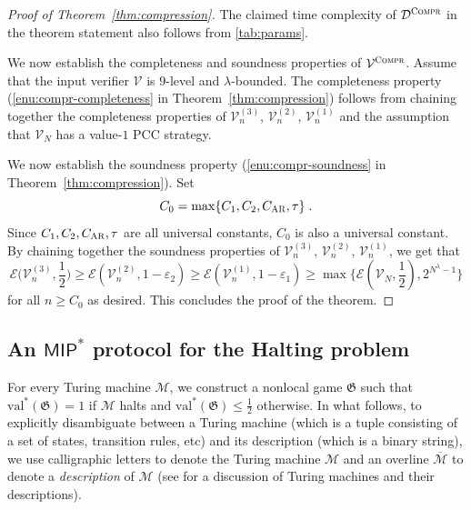\documentclass[11pt]{article}
\theoremstyle{definition}
\newcommand{\val}{\ensuremath{\mathrm{val}}}
\newcommand{\eps}{\varepsilon}
\newcommand{\game}{\mathfrak{G}}
\newcommand{\decider}{\mathcal{D}}
\newcommand{\verifier}{\mathcal{V}}
\newcommand{\gamestyle}[1]{\ensuremath{\textsc{#1}}\xspace}
\newcommand{\ar}{\gamestyle{AR}}
\newcommand{\Ent}{\mathscr{E}}
\newcommand{\compr}{\textsc{Compr}}
\renewcommand{\cal}[1]{\mathcal{#1}}
\begin{document}
\begin{proof}[Proof of Theorem~\ref{thm:compression}]
  The claimed time complexity of $\decider^\compr$ in the theorem statement
  also follows from \cref{tab:params}. 

  We now establish the completeness and soundness properties of
  $\verifier^\compr$.
  Assume that the input verifier $\verifier$ is $9$-level and $\lambda$-bounded. 
The completeness property (\cref{enu:compr-completeness} in
  Theorem~\ref{thm:compression}) follows from chaining together the completeness
  properties of $\verifier^{(3)}_n$, $\verifier^{(2)}_n$, $\verifier^{(1)}_n$
  and the assumption that $\verifier_N$ has a value-$1$ PCC strategy.

  We now establish the soundness property (\cref{enu:compr-soundness} in
  Theorem~\ref{thm:compression}). Set 
    \begin{equation}
  \label{eq:c_0-recursive}
  	C_0 = \max \{ C_1, C_2, C_\ar,\tau \} \;.
  \end{equation}
  Since $C_1, C_2, C_\ar, \tau$ are all universal constants, $C_0$ is also a universal constant.
 By chaining together the soundness properties of $\verifier^{(3)}_n$, $\verifier^{(2)}_n$, $\verifier^{(1)}_n$, 
 we get that 
 \[
 	\Ent \big(
    \verifier_n^{(3)}, \frac{1}{2} \big) \geq \Ent(\verifier_n^{(2)}, 1 - \eps_2)
 \geq \Ent(\verifier_n^{(1)}, 1 - \eps_1) \geq \max \big
    \{\Ent(\verifier_N, \frac{1}{2}), 2^{N^\lambda - 1} \big \}
 \]
 for all $n \geq C_0$ as desired. This concludes the proof of the theorem.
\end{proof}

\subsection{An $\mathsf{MIP}^*$ protocol for the Halting problem}
\label{sec:halt}

For every Turing machine $\cal{M}$, we construct a nonlocal game $\game$ such
that $\val^*(\game) = 1$ if $\cal{M}$ halts and $\val^*(\game) \le \frac{1}{2}$
otherwise.  In what follows, to explicitly disambiguate between 
a Turing machine (which is a tuple consisting of a set of states, transition rules, etc) and its description 
(which is a binary string), we use calligraphic letters to denote the Turing machine $\cal{M}$ and
an overline $\overline{\cal{M}}$ to denote a \emph{description} of $\cal{M}$ (see 
 for a discussion of Turing machines and their descriptions).
\end{document}
